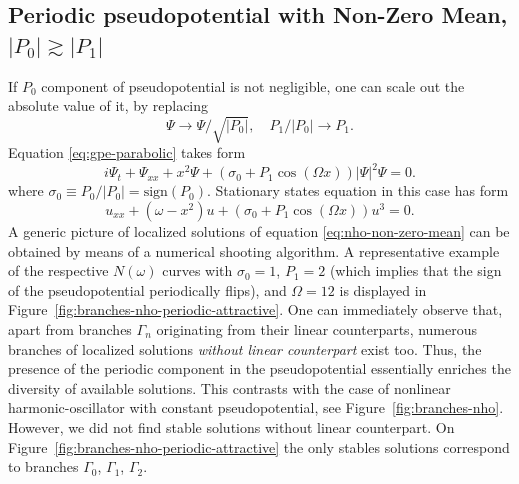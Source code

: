 \subsection{Periodic pseudopotential with Non-Zero Mean, $|P_0| \gtrsim |P_1|$}

If $P_0$ component of pseudopotential is not negligible, one can scale out the absolute value of it, by replacing 
\begin{equation}
	\Psi \to \Psi / \sqrt{|P_0|}, \quad P_1 / |P_0| \to P_1.
\end{equation}
Equation \eqref{eq:gpe-parabolic} takes form
\begin{equation}
	i \Psi_t + \Psi_{xx} + x^2 \Psi + (\sigma_0 + P_1 \cos (\Omega x)) |\Psi|^2 \Psi = 0.
\label{eq:gpe-non-zero-mean}
\end{equation}
where $\sigma_0 \equiv P_0 / |P_0| = \mathrm{sign} (P_0)$.
Stationary states equation in this case has form
\begin{equation}
	u_{xx} + (\omega - x^2) u + (\sigma_0 + P_1 \cos (\Omega x)) u^3 = 0.
\label{eq:nho-non-zero-mean}
\end{equation}
A generic picture of localized solutions of equation \eqref{eq:nho-non-zero-mean} can be obtained by means of a numerical shooting algorithm.
A representative example of the respective $N(\omega)$ curves with $\sigma_0 = 1$, $P_1 = 2$ (which implies that the sign of the pseudopotential periodically flips), and $\Omega = 12$ is displayed in Figure~\ref{fig:branches-nho-periodic-attractive}.
One can immediately observe that, apart from branches $\Gamma_n$ originating from their linear counterparts, numerous branches of localized solutions {\it without linear counterpart} exist too.
Thus, the presence of the periodic component in the pseudopotential essentially enriches the diversity of available solutions.
This contrasts with the case of nonlinear harmonic-oscillator with constant pseudopotential, see Figure~\ref{fig:branches-nho}.
However, we did not find stable solutions without linear counterpart.
On Figure~\ref{fig:branches-nho-periodic-attractive} the only stables solutions correspond to branches $\Gamma_0$, $\Gamma_1$, $\Gamma_2$.

